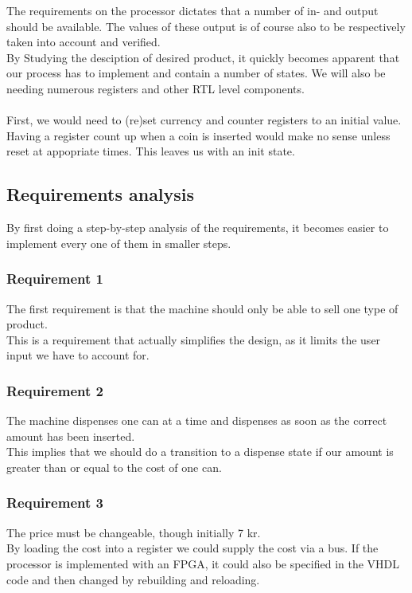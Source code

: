 The requirements on the processor dictates that a number of in- and output should be available. The values of these output is of course also to be respectively taken into account and verified.\\
By Studying the desciption of desired product, it quickly becomes apparent that our process has to implement and contain a number of states. We will also be needing numerous registers and other RTL level components.\\\\
First, we would need to (re)set currency and counter registers to an initial value. Having a register count up when a coin is inserted would make no sense unless reset at appopriate times. This leaves us with an init state.


\subsection{Requirements analysis}
\label{sec:requirement_analysis}
By first doing a step-by-step analysis of the requirements, it becomes easier to implement every one of them in smaller steps.
\subsubsection*{Requirement 1}
The first requirement is that the machine should only be able to sell one type of product.\\
This is a requirement that actually simplifies the design, as it limits the user input we have to account for.

\subsubsection*{Requirement 2}
The machine dispenses one can at a time and dispenses as soon as the correct amount has been inserted.\\
This implies that we should do a transition to a dispense state if our amount is greater than or equal to the cost of one can.

\subsubsection*{Requirement 3}
The price must be changeable, though initially 7 kr.\\
By loading the cost into a register we could supply the cost via a bus. If the processor is implemented with an FPGA, it could also be specified in the VHDL code and then changed by rebuilding and reloading.

